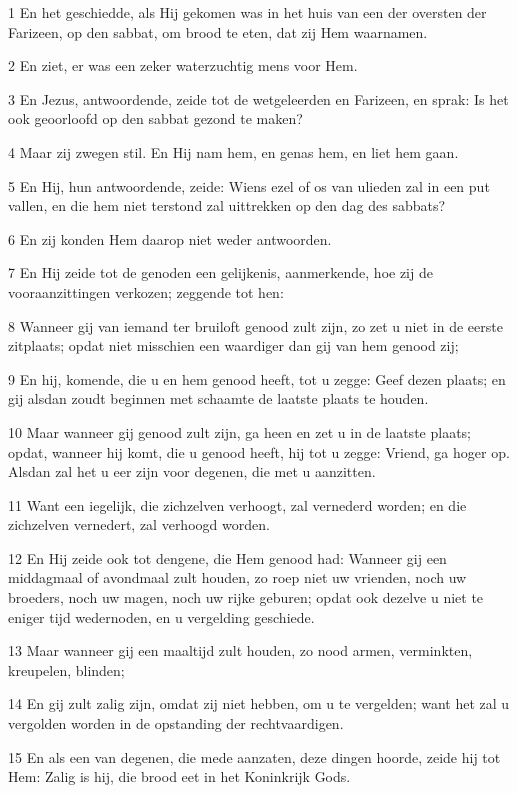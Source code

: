 \par 1 En het geschiedde, als Hij gekomen was in het huis van een der oversten der Farizeen, op den sabbat, om brood te eten, dat zij Hem waarnamen.
\par 2 En ziet, er was een zeker waterzuchtig mens voor Hem.
\par 3 En Jezus, antwoordende, zeide tot de wetgeleerden en Farizeen, en sprak: Is het ook geoorloofd op den sabbat gezond te maken?
\par 4 Maar zij zwegen stil. En Hij nam hem, en genas hem, en liet hem gaan.
\par 5 En Hij, hun antwoordende, zeide: Wiens ezel of os van ulieden zal in een put vallen, en die hem niet terstond zal uittrekken op den dag des sabbats?
\par 6 En zij konden Hem daarop niet weder antwoorden.
\par 7 En Hij zeide tot de genoden een gelijkenis, aanmerkende, hoe zij de vooraanzittingen verkozen; zeggende tot hen:
\par 8 Wanneer gij van iemand ter bruiloft genood zult zijn, zo zet u niet in de eerste zitplaats; opdat niet misschien een waardiger dan gij van hem genood zij;
\par 9 En hij, komende, die u en hem genood heeft, tot u zegge: Geef dezen plaats; en gij alsdan zoudt beginnen met schaamte de laatste plaats te houden.
\par 10 Maar wanneer gij genood zult zijn, ga heen en zet u in de laatste plaats; opdat, wanneer hij komt, die u genood heeft, hij tot u zegge: Vriend, ga hoger op. Alsdan zal het u eer zijn voor degenen, die met u aanzitten.
\par 11 Want een iegelijk, die zichzelven verhoogt, zal vernederd worden; en die zichzelven vernedert, zal verhoogd worden.
\par 12 En Hij zeide ook tot dengene, die Hem genood had: Wanneer gij een middagmaal of avondmaal zult houden, zo roep niet uw vrienden, noch uw broeders, noch uw magen, noch uw rijke geburen; opdat ook dezelve u niet te eniger tijd wedernoden, en u vergelding geschiede.
\par 13 Maar wanneer gij een maaltijd zult houden, zo nood armen, verminkten, kreupelen, blinden;
\par 14 En gij zult zalig zijn, omdat zij niet hebben, om u te vergelden; want het zal u vergolden worden in de opstanding der rechtvaardigen.
\par 15 En als een van degenen, die mede aanzaten, deze dingen hoorde, zeide hij tot Hem: Zalig is hij, die brood eet in het Koninkrijk Gods.
